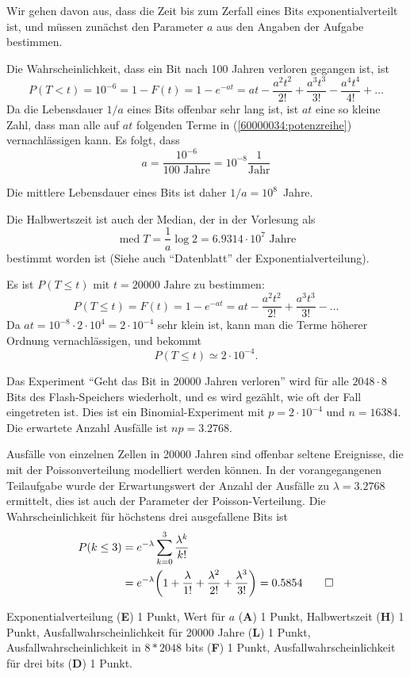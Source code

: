 \begin{loesung}
Wir gehen davon aus, dass die Zeit bis zum Zerfall eines Bits 
exponentialverteilt ist, und müssen zunächst den Parameter $a$
aus den Angaben der Aufgabe bestimmen.

Die Wahrscheinlichkeit, dass ein Bit nach 100 Jahren verloren gegangen
ist, ist
\begin{equation}
P(T < t) = 10^{-6}=
1-F(t)=1-e^{-at}
=at-\frac{a^2t^2}{2!}+\frac{a^3t^3}{3!}-\frac{a^4t^4}{4!}+\dots
\label{60000034:potenzreihe}
\end{equation}
Da die Lebensdauer $1/a$ eines Bits offenbar sehr lang ist, ist $at$
eine so kleine Zahl, dass man alle auf $at$ folgenden Terme
in (\ref{60000034:potenzreihe}) vernachlässigen kann. Es folgt, dass
\[
a=\frac{10^{-6}}{100\text{ Jahre}}=10^{-8}\frac{1}{\text{Jahr}}
\]
\begin{teilaufgaben}
\item
Die mittlere Lebensdauer eines Bits ist daher $1/a=10^8$~Jahre.
\item
Die Halbwertszeit ist auch der Median, der in der Vorlesung als
\[
\operatorname{med} T=\frac1a\log 2=6.9314\cdot10^{7} \text{ Jahre}
\]
bestimmt worden ist (Siehe auch ``Datenblatt'' der Exponentialverteilung).
\item
Es ist $P(T\le t)$ mit $t=20000\text{ Jahre}$ zu bestimmen:
\[
P(T\le t)
=
F(t)
=
1-e^{-at}
=
at-\frac{a^2t^2}{2!}+\frac{a^3t^3}{3!}-\dots
\]
Da $at=10^{-8}\cdot 2\cdot 10^4=2\cdot 10^{-4}$ sehr klein ist, kann man die 
Terme höherer Ordnung vernachlässigen, und bekommt
\[
P(T\le t) \simeq 2\cdot 10^{-4}.
\]
\item 
Das Experiment ``Geht das Bit in 20000 Jahren verloren'' wird
für alle $2048\cdot 8$ Bits des Flash-Speichers wiederholt, und es
wird gezählt, wie oft der Fall eingetreten ist.
Dies ist ein Binomial-Experiment mit $p=2\cdot 10^{-4}$ und $n=16384$.
Die erwartete Anzahl Ausfälle ist $np=3.2768$.
\item
Ausfälle von einzelnen Zellen in 20000 Jahren sind offenbar seltene Ereignisse,
die mit der Poissonverteilung modelliert werden können.
In der vorangegangenen Teilaufgabe wurde der Erwartungswert der Anzahl
der Ausfälle zu $\lambda = 3.2768$ ermittelt, dies ist auch der Parameter
der Poisson-Verteilung.
Die Wahrscheinlichkeit für höchstens drei ausgefallene Bits ist
\begin{align*}
P(k\le 3)&=e^{-\lambda}\sum_{k=0}^3\frac{\lambda^k}{k!}
\\
&=e^{-\lambda}\biggl(
1+\frac{\lambda}{1!}
+
\frac{\lambda^2}{2!}
+
\frac{\lambda^3}{3!}
\biggr)
=0.5854
\qedhere
\end{align*}
\end{teilaufgaben}
\end{loesung}

\begin{bewertung}
Exponentialverteilung ({\bf E}) 1 Punkt,
Wert für $a$ ({\bf A}) 1 Punkt,
Halbwertszeit ({\bf H}) 1 Punkt,
Ausfallwahrscheinlichkeit für 20000 Jahre ({\bf L}) 1 Punkt,
Ausfallwahrscheinlichkeit in $8*2048$ bits ({\bf F}) 1 Punkt,
Ausfallwahrscheinlichkeit für drei bits ({\bf D}) 1 Punkt.
\end{bewertung}

